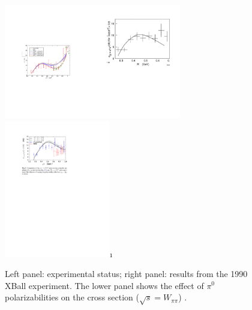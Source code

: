 
\begin{figure}[ht]
\begin{center}
\includegraphics[height=5cm,angle=0]{figures/Fig-TP-2pr.pdf}\includegraphics[height=5cm,angle=0]{figures/XBall.pdf}\\
\includegraphics[height=6cm,angle=0]{figures/Fig-TP-5.pdf}\i
\end{center}
\caption{Left panel: experimental status; right panel: results from the 1990
XBall experiment. The lower panel shows the effect of $\pi^0$ polarizabilities
on the cross section ($\sqrt{s}=W_{\pi\pi}$) \cite{Moussallam:2013una} .
\label{fig:previousdata}}
\end{figure}

